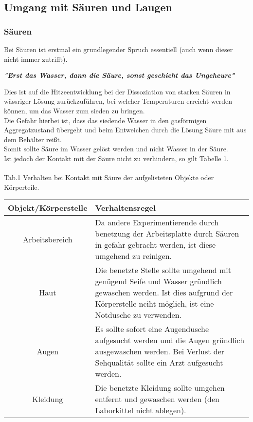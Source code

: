 \documentclass{article}
\begin{document}
\newpage

\subsection{Umgang mit Säuren und Laugen}


\subsubsection{Säuren}
Bei Säuren ist erstmal ein grundlegender Spruch essentiell (auch wenn dieser nicht immer zutrifft).\\
\begin{center}
    \textbf{\textit{"Erst das Wasser, dann die Säure, sonst geschieht das Ungeheure"}}
\end{center}
Dies ist auf die Hitzeentwicklung bei der Dissoziation von starken Säuren in wässriger Lösung zurückzuführen, bei welcher Temperaturen erreicht werden können, um das Wasser zum sieden zu bringen.\\
Die Gefahr hierbei ist, dass das siedende Wasser in den gasförmigen Aggregatzustand übergeht und beim Entweichen durch die Lösung Säure mit aus dem Behälter reißt.\\
Somit sollte Säure im Wasser gelöst werden und nicht Wasser in der Säure.\\
Ist jedoch der Kontakt mit der Säure nicht zu verhindern, so gilt Tabelle 1.\\\\
Tab.1 Verhalten bei Kontakt mit Säure der aufgelisteten Objekte oder Körperteile.
\begin{center}
    \begin{tabular}{c | p{8cm}}
        Objekt/Körperstelle & Verhaltensregel\\
        \hline
        Arbeitsbereich & Da andere Experimentierende durch benetzung der Arbeitsplatte durch Säuren in gefahr gebracht werden, ist diese umgehend zu reinigen.\\
        \hline
        Haut & Die benetzte Stelle sollte umgehend mit genügend Seife und Wasser gründlich gewaschen werden. Ist dies aufgrund der Körperstelle nciht möglich, ist eine Notdusche zu verwenden.\\
        \hline
        Augen & Es sollte sofort eine Augendusche aufgesucht werden und die Augen gründlich ausgewaschen werden. Bei Verlust der Sehqualität sollte ein Arzt aufgesucht werden.\\
        \hline
        Kleidung & Die benetzte Kleidung sollte umgehen entfernt und gewaschen werden (den Laborkittel nicht ablegen).
    \end{tabular}
\end{center}
\end{document}
